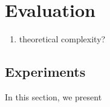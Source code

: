
\chapter{Evaluation}
\label{ch:Evaluation}
\begin{enumerate}
	\item theoretical complexity?
\end{enumerate}

\section{Experiments}
In this section, we present